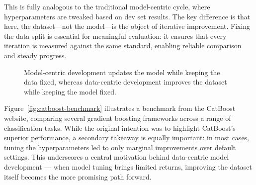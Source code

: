 \documentclass[12pt,openany]{book}
\begin{document}
This is fully analogous to the traditional model-centric cycle, where hyperparameters are tweaked based on dev set results. The key difference is that here, the dataset—not the model—is the object of iterative improvement. Fixing the data split is essential for meaningful evaluation: it ensures that every iteration is measured against the same standard, enabling reliable comparison and steady progress.


\begin{figure}[H]
\centering
{}
\caption{Model-centric development updates the model while keeping the data fixed, whereas data-centric development improves the dataset while keeping the model fixed.}
\label{fig:model-vs-data-centric}
\end{figure}


Figure~\ref{fig:catboost-benchmark} illustrates a benchmark from the CatBoost website, comparing several gradient boosting frameworks across a range of classification tasks. While the original intention was to highlight CatBoost’s superior performance, a secondary takeaway is equally important: in most cases, tuning the hyperparameters led to only marginal improvements over default settings. This underscores a central motivation behind data-centric model development — when model tuning brings limited returns, improving the dataset itself becomes the more promising path forward.
\end{document}
